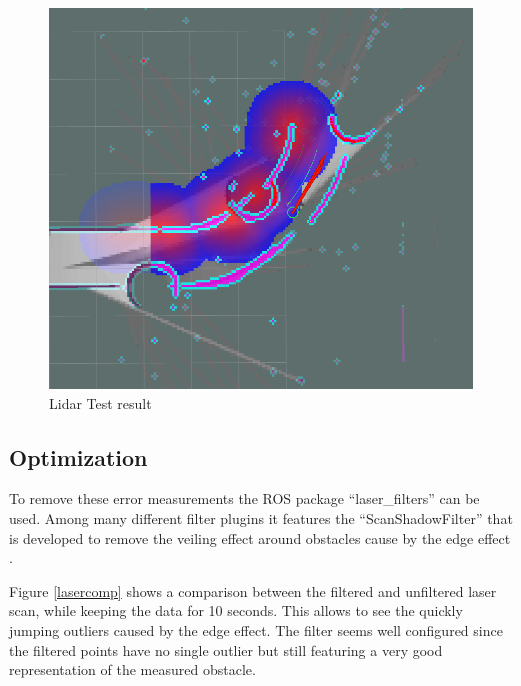 \begin{figure}[H]
	\includegraphics[width=\textwidth]{Pictures/Needs filtering of Laser}
	\caption{Lidar Test result}
	\label{unfiltered lidar}
\end{figure}

\subsection{Optimization}
To remove these error measurements the ROS package ``laser\_filters'' can be used. Among many different filter plugins it features the ``ScanShadowFilter'' that is developed to remove the veiling effect around obstacles cause by the edge effect \cite{laserfilters}.


Figure \ref{lasercomp} shows a comparison between the filtered and unfiltered laser scan, while keeping the data for 10 seconds. This allows to see the quickly jumping outliers caused by the edge effect. The filter seems well configured since the filtered points have no single outlier but still featuring a very good representation of the measured obstacle.


